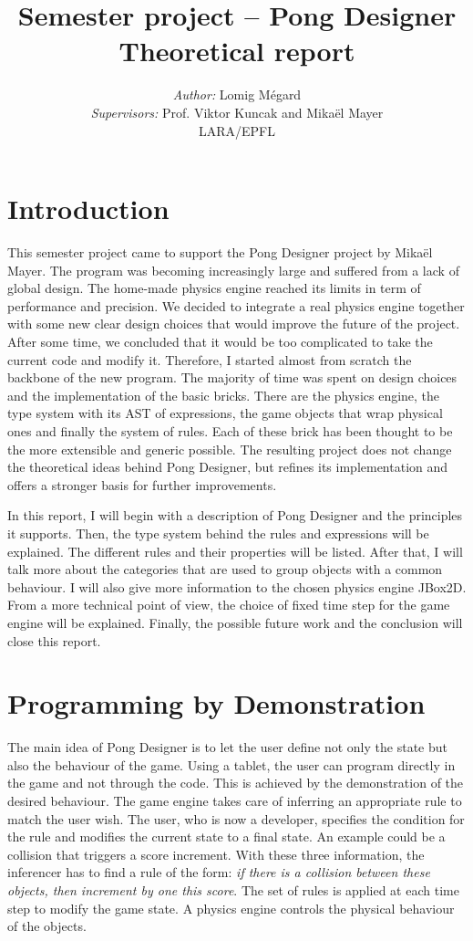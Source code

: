 \documentclass[11pt,a4paper]{article}
\title{Semester project -- Pong Designer\\Theoretical report}
\author{\textit{Author:} Lomig Mégard\\
\textit{Supervisors:} Prof. Viktor Kuncak and Mikaël Mayer\vspace*{0.5cm}\\
\textsc{LARA/EPFL}}
\begin{document}
\maketitle

\section{Introduction}
This semester project came to support the Pong Designer project by Mikaël Mayer. The program was becoming increasingly large and suffered from a lack of global design. The home-made physics engine reached its limits in term of performance and precision. We decided to integrate a real physics engine together with some new clear design choices that would improve the future of the project. After some time, we concluded that it would be too complicated to take the current code and modify it. Therefore, I started almost from scratch the backbone of the new program. The majority of time was spent on design choices and the implementation of the basic bricks. There are the physics engine, the type system with its AST of expressions, the game objects that wrap physical ones and finally the system of rules. Each of these brick has been thought to be the more extensible and generic possible. The resulting project does not change the theoretical ideas behind Pong Designer, but refines its implementation and offers a stronger basis for further improvements.

In this report, I will begin with a description of Pong Designer and the principles it supports. Then, the type system behind the rules and expressions will be explained. The different rules and their properties will be listed. After that, I will talk more about the categories that are used to group objects with a common behaviour. I will also give more information to the chosen physics engine JBox2D. From a more technical point of view, the choice of fixed time step for the game engine will be explained. Finally, the possible future work and the conclusion will close this report.

\section{Programming by Demonstration}
The main idea of Pong Designer is to let the user define not only the state but also the behaviour of the game. Using a tablet, the user can program directly in the game and not through the code. This is achieved by the demonstration of the desired behaviour. The game engine takes care of inferring an appropriate rule to match the user wish. The user, who is now a developer, specifies the condition for the rule and modifies the current state to a final state. An example could be a collision that triggers a score increment. With these three information, the inferencer has to find a rule of the form: \textit{if there is a collision between these objects, then increment by one this score}. The set of rules is applied at each time step to modify the game state. A physics engine controls the physical behaviour of the objects. 
\end{document}
